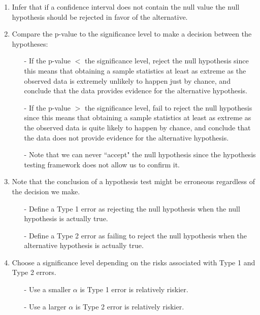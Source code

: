 \documentclass[11pt]{article}
\begin{document}
\begin{enumerate}[resume]
\item Infer that if a confidence interval does not contain the null value the null hypothesis should be rejected in favor of the alternative.

\item Compare the p-value to the significance level to make a decision between the hypotheses:
\begin{itemize}
\item[-] If the p-value $<$ the significance level, reject the null hypothesis since this means that obtaining a sample statistics at least as extreme as the observed data is extremely unlikely to happen just by chance, and conclude that the data provides evidence for the alternative hypothesis.
\item[-] If the p-value $>$ the significance level, fail to reject the null hypothesis since this means that obtaining a sample statistics at least as extreme as the observed data is quite likely to happen by chance, and conclude that the data does not provide evidence for the alternative hypothesis.
\item[-] Note that we can never ``accept" the null hypothesis since the hypothesis testing framework does not allow us to confirm it.
\end{itemize}

\item Note that the conclusion of a hypothesis test might be erroneous regardless of the decision we make.
\begin{itemize}
\item[-] Define a Type 1 error as rejecting the null hypothesis when the null hypothesis is actually true.
\item[-] Define a Type 2 error as failing to reject the null hypothesis when the alternative hypothesis is actually true.
\end{itemize}

\item Choose a significance level depending on the risks associated with Type 1 and Type 2 errors.
\begin{itemize}
\item[-] Use a smaller $\alpha$ is Type 1 error is relatively riskier.
\item[-] Use a larger $\alpha$ is Type 2 error is relatively riskier.
\end{itemize}

\end{enumerate}
\end{document}
